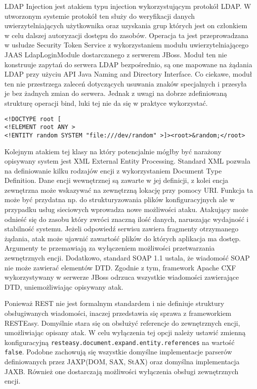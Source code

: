 	LDAP Injection jest atakiem typu injection wykorzystującym protokół LDAP. W utworzonym systemie protokół ten służy do weryfikacji danych uwierzytelniających użytkownika oraz uzyskania grup których jest on członkiem w celu dalszej autoryzacji dostępu do zasobów.  Operacja ta jest przeprowadzana w usłudze Security Token Service z wykorzystaniem modułu uwierzytelniającego JAAS LdapLoginModule dostarczanego z serwerem JBoss. Moduł ten nie konstruuje zapytań do serwera LDAP bezpośrednio, są one mapowane na żądania LDAP przy użyciu API Java Naming and Directory Interface. Co ciekawe, moduł ten nie przestrzega zaleceń dotyczących usuwania znaków specjalnych i przesyła je bez żadnych zmian do serwera. Jednak z uwagi na dobrze zdefiniowaną strukturę operacji bind, luki tej nie da się w praktyce wykorzystać. 
	
	\begin{lstlisting}
<!DOCTYPE root [  
<!ELEMENT root ANY >
<!ENTITY random SYSTEM "file:///dev/random" >]><root>&random;</root>
	\end{lstlisting}
	
	Kolejnym atakiem tej klasy na który potencjalnie mógłby być narażony opisywany system jest XML External Entity Processing. Standard XML pozwala na definiowanie kilku rodzajów encji z wykorzystaniem Document Type Definition. Dane encji wewnętrznej są zawarte w jej definicji, z kolei encja zewnętrzna może wskazywać na zewnętrzną lokację przy pomocy URI. Funkcja ta może być przydatna np. do strukturyzowania plików konfiguracyjnych ale w przypadku usług sieciowych wprowadza nowe możliwości ataku. Atakujący może odnieść się do zasobu który zwróci znaczną ilość danych, naruszając wydajność i stabilność systemu. Jeżeli odpowiedź serwisu zawiera fragmenty otrzymanego żądania, atak może ujawnić zawartość plików do których aplikacja ma dostęp. Argumenty te przemawiają za wyłączeniem możliwości przetwarzania zewnętrznych encji. Dodatkowo, standard SOAP 1.1 ustala, że wiadomość SOAP nie może zawierać elementów DTD. Zgodnie z tym, framework Apache CXF wykorzystywany w serwerze JBoss odrzuca wszystkie wiadomości zawierające DTD\cite{ApacheCXF}, uniemożliwiając opisywany atak.
	
	Ponieważ REST nie jest formalnym standardem i nie definiuje struktury obsługiwanych wiadomości, inaczej przedstawia się sprawa z frameworkiem RESTEasy. Domyślnie stara się on obsłużyć referencje do zewnętrznych encji, umożliwiając opisany atak. W celu wyłączenia tej opcji należy ustawić zmienną konfiguracyjną \texttt{resteasy.document.expand.entity.references} na wartość \texttt{false}. Podobne zachowują się wszystkie domyślne implementacje parserów definiowanych przez JAXP(DOM, SAX, StAX)  oraz domyślna implementacja JAXB. Również one dostarczają możliwości wyłączenia obsługi zewnętrznych encji.

